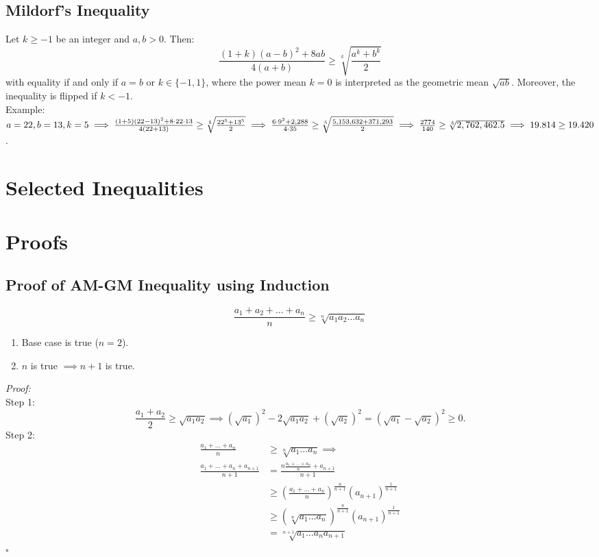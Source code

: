 \documentclass[a4paper,11pt]{article}
\begin{document}
\subsection{Mildorf's Inequality}
\begin{tcolorbox}
    Let $k\geq-1$ be an integer and $a,b>0$. Then:
    \[
    \frac{(1+k)(a-b)^2+8ab}{4(a+b)} \geq \sqrt[k]{\frac{a^k+b^k}{2}}
    \]
    with equality if and only if $a=b$ or $k\in\{-1,1\}$, where the power mean $k=0$ is interpreted as the geometric mean $\sqrt{ab}$. Moreover, the inequality is flipped if $k<-1$. \\[6pt]
    Example: $\textstyle a=22, b=13,k=5 \\[6pt]
    \implies \frac{(1+5)(22-13)^2+8\cdot22\cdot13}{4(22+13)} \geq \sqrt[5]{\frac{22^5+13^5}{2}} \implies \frac{6\cdot9^2+2,288}{4\cdot35} \geq \sqrt[5]{\frac{5,153,632+371,293}{2}} \\[6pt]
    \implies \frac{2774}{140} \geq \sqrt[5]{2,762,462.5} \implies 19.814 \geq 19.420$.
\end{tcolorbox}


\section{Selected Inequalities}
\section{Proofs}
\subsection{Proof of AM-GM Inequality using Induction}
\begin{tcolorbox}[breakable]
    \[
    \frac{a_1 + a_2 + \dots + a_n}{n} \geq \sqrt[n]{a_1 a_2 \dots a_n}
    \]
    \begin{enumerate}[label=\roman*.]
        \item Base case is true ($n=2$).
        \item $n$ is true $\implies n+1$ is true.
    \end{enumerate}
    \emph{Proof:} \\[6pt]
    Step 1:
    \[
    \frac{a_1 + a_2}{2} \geq \sqrt{a_1 a_2} \implies (\sqrt{a_1})^2 - 2\sqrt{a_1 a_2} + (\sqrt{a_2})^2 = (\sqrt{a_1} - \sqrt{a_2})^2 \geq 0.
    \]
    Step 2:
    \begin{align*}
        \frac{a_1 + \dots + a_n}{n} &\geq \sqrt[n]{a_1 \dots a_n} \implies\\
        \frac{a_1 + \dots + a_n + a_{n+1}}{n+1} &= \frac{ n \frac{a_1 + \dots + a_n}{n} + a_{n+1}}{n+1} \\  &\geq \left( \frac{a_1 + \dots + a_n}{n} \right)^{\frac{n}{n+1}} (a_{n+1})^{\frac{1}{n+1}} \\
        &\geq \left( \sqrt[n]{a_1 \dots a_n} \right)^{\frac{n}{n+1}} (a_{n+1})^{\frac{1}{n+1}} \\
        &= \sqrt[n+1]{a_1 \dots a_n a_{n+1}} 
    \end{align*}
    \hfill$\square$
\end{tcolorbox}
\end{document}
